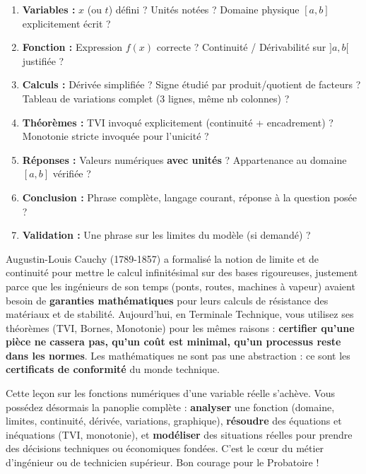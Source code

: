 \documentclass[11pt]{article}
\begin{document}
\begin{methode}
\begin{enumerate}
    \item \textbf{Variables :} $x$ (ou $t$) défini ? Unités notées ? Domaine physique $[a,b]$ explicitement écrit ?
    \item \textbf{Fonction :} Expression $f(x)$ correcte ? Continuité / Dérivabilité sur $]a,b[$ justifiée ?
    \item \textbf{Calculs :} Dérivée simplifiée ? Signe étudié par produit/quotient de facteurs ? Tableau de variations complet (3 lignes, même nb colonnes) ?
    \item \textbf{Théorèmes :} TVI invoqué explicitement (continuité + encadrement) ? Monotonie stricte invoquée pour l'unicité ?
    \item \textbf{Réponses :} Valeurs numériques \textbf{avec unités} ? Appartenance au domaine $[a,b]$ vérifiée ?
    \item \textbf{Conclusion :} Phrase complète, langage courant, réponse à la question posée ?
    \item \textbf{Validation :} Une phrase sur les limites du modèle (si demandé) ?
\end{enumerate}
\end{methode}

\begin{savaistu}
Augustin-Louis Cauchy (1789-1857) a formalisé la notion de limite et de continuité pour mettre le calcul infinitésimal sur des bases rigoureuses, justement parce que les ingénieurs de son temps (ponts, routes, machines à vapeur) avaient besoin de \textbf{garanties mathématiques} pour leurs calculs de résistance des matériaux et de stabilité. Aujourd'hui, en Terminale Technique, vous utilisez ses théorèmes (TVI, Bornes, Monotonie) pour les mêmes raisons : \textbf{certifier qu'une pièce ne cassera pas, qu'un coût est minimal, qu'un processus reste dans les normes}. Les mathématiques ne sont pas une abstraction : ce sont les \textbf{certificats de conformité} du monde technique.
\end{savaistu}

Cette leçon sur les fonctions numériques d'une variable réelle s'achève. Vous possédez désormais la panoplie complète : \textbf{analyser} une fonction (domaine, limites, continuité, dérivée, variations, graphique), \textbf{résoudre} des équations et inéquations (TVI, monotonie), et \textbf{modéliser} des situations réelles pour prendre des décisions techniques ou économiques fondées. C'est le cœur du métier d'ingénieur ou de technicien supérieur. Bon courage pour le Probatoire !
\end{document}
